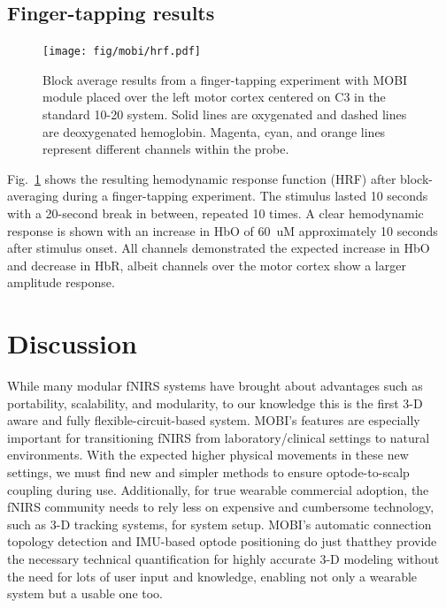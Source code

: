 \subsection{Finger-tapping results}
\begin{figure}
	\begin{center}
	\texttt{[image: fig/mobi/hrf.pdf]}
	\end{center}
	\caption{Block average results from a finger-tapping experiment with MOBI module placed over the left motor cortex centered on C3 in the standard 10-20 system. Solid lines are oxygenated and dashed lines are deoxygenated hemoglobin. Magenta, cyan, and orange lines represent different channels within the probe.}
	\label{fig:hrf}
\end{figure} 
Fig.~\ref{fig:hrf} shows the resulting hemodynamic response function (HRF) after block-averaging during a finger-tapping experiment. The stimulus lasted 10 seconds with a 20-second break in between, repeated 10 times. A clear hemodynamic response is shown with an increase in HbO of 60~uM approximately 10 seconds after stimulus onset. All channels demonstrated the expected increase in HbO and decrease in HbR, albeit channels over the motor cortex show a larger amplitude response. %



\section{Discussion}
\label{chap:mobi:discussion}
While many modular fNIRS systems have brought about advantages such as portability, scalability, and modularity, to our knowledge this is the first 3-D aware and fully flexible-circuit-based system. MOBI's features are especially important for transitioning fNIRS from laboratory/clinical settings to natural environments. With the expected higher physical movements in these new settings, we must find new and simpler methods to ensure optode-to-scalp coupling during use. Additionally, for true wearable commercial adoption, the fNIRS community needs to rely less on expensive and cumbersome technology, such as 3-D tracking systems, for system setup. MOBI's automatic connection topology detection and IMU-based optode positioning do just that\textemdash they provide the necessary technical quantification for highly accurate 3-D modeling without the need for lots of user input and knowledge, enabling not only a wearable system but a usable one too. 

